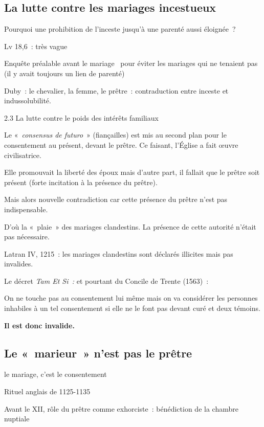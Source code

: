 \hypertarget{la-lutte-contre-les-mariages-incestueux}{%
\subsection{La lutte contre les mariages
incestueux}\label{la-lutte-contre-les-mariages-incestueux}}

Pourquoi une prohibition de l'inceste jusqu'à une parenté aussi
éloignée~?

Lv 18,6~: très vague

Enquête préalable avant le mariage~ pour éviter les mariages qui ne
tenaient pas (il y avait toujours un lien de parenté)

Duby~: le chevalier, la femme, le prêtre~: contraduction entre inceste
et indussolubilité.

2.3 La lutte contre le poids des intérêts familiaux

Le «~\emph{consensus de futuro}~» (fiançailles) est mis au second plan
pour le consentement au présent, devant le prêtre. Ce faisant, l'Église
a fait œuvre civilisatrice.

Elle promouvait la liberté des époux mais d'autre part, il fallait que
le prêtre soit présent (forte incitation à la présence du prêtre).

Mais alors nouvelle contradiction car cette présence du prêtre n'est pas
indispensable.

D'où la «~plaie~» des mariages clandestins. La présence de cette
autorité n'était pas nécessaire.

Latran IV, 1215~: les mariages clandestins sont déclarés illicites mais
pas invalides.

Le décret \emph{Tam Et Si~:} et pourtant du Concile de Trente (1563)~:

On ne touche pas au consentement lui même mais on va considérer les
personnes inhabiles à un tel consentement si elle ne le font pas devant
curé et deux témoins.

\textbf{Il est donc invalide.}

\hypertarget{le-marieur-nest-pas-le-pruxeatre}{%
\subsection{Le «~marieur~» n'est pas le
prêtre}\label{le-marieur-nest-pas-le-pruxeatre}}

le mariage, c'est le consentement

Rituel anglais de 1125-1135

Avant le XII, rôle du prêtre comme exhorciste~: bénédiction de la
chambre nuptiale

